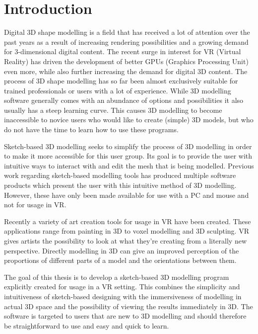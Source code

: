\setcounter{chapter}{0}

\chapter{Introduction}
\label{chap:intro}
Digital 3D shape modelling is a field that has received a lot of attention over the past years as a result of increasing rendering possibilities and a growing demand for 3-dimensional digital content. The recent surge in interest for VR (Virtual Reality) has driven the development of better GPUs (Graphics Processing Unit) even more, while also further increasing the demand for digital 3D content. 
The process of 3D shape modelling has so far been almost exclusively suitable for trained professionals or users with a lot of experience. While 3D modelling software generally comes with an abundance of options and possibilities it also usually has a steep learning curve. This causes 3D modelling to become inaccessible to novice users who would like to create (simple) 3D models, but who do not have the time to learn how to use these programs. 

Sketch-based 3D modelling seeks to simplify the process of 3D modelling in order to make it more accessible for this user group. Its goal is to provide the user with intuitive ways to interact with and edit the mesh that is being modelled. Previous work regarding sketch-based modelling tools has produced multiple software products which present the user with this intuitive method of 3D modelling. However, these have only been made available for use with a PC and mouse and not for usage in VR. 

Recently a variety of art creation tools for usage in VR have been created. These applications range from painting in 3D to voxel modelling and 3D sculpting. VR gives artists the possibility to look at what they're creating from a literally new perspective. Directly modelling in 3D can give an improved perception of the proportions of different parts of a model and the orientations between them.

The goal of this thesis is to develop a sketch-based 3D modelling program explicitly created for usage in a VR setting. This combines the simplicity and intuitiveness of sketch-based designing with the immersiveness of modelling in actual 3D space and the possibility of viewing the results immediately in 3D. The software is targeted to users that are new to 3D modelling and should therefore be straightforward to use and easy and quick to learn.

